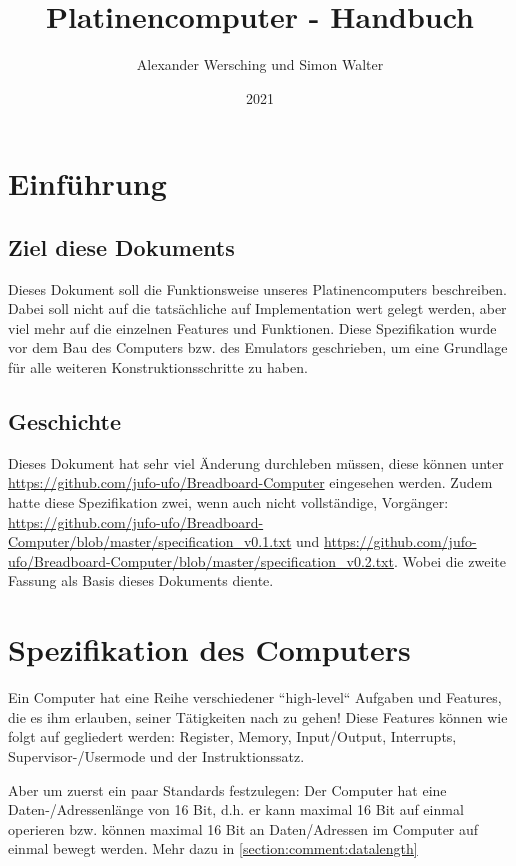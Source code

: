 \documentclass{scrartcl}
\begin{document}
\title{Platinencomputer - Handbuch}
\author{Alexander Wersching und Simon Walter}
\date{2021}
\maketitle
\newpage


\tableofcontents
\newpage

\section{Einführung}
\subsection{Ziel diese Dokuments}
Dieses Dokument soll die Funktionsweise unseres Platinencomputers beschreiben.
Dabei soll nicht auf die tatsächliche auf Implementation wert gelegt werden, aber viel mehr auf die einzelnen Features und Funktionen.
Diese Spezifikation wurde vor dem Bau des Computers bzw. des Emulators geschrieben, um eine Grundlage für alle weiteren Konstruktionsschritte zu haben.

\subsection{Geschichte}
Dieses Dokument hat sehr viel Änderung durchleben müssen, diese können unter \url{https://github.com/jufo-ufo/Breadboard-Computer} eingesehen werden.
Zudem hatte diese Spezifikation zwei, wenn auch nicht vollständige, Vorgänger: \url{https://github.com/jufo-ufo/Breadboard-Computer/blob/master/specification_v0.1.txt} und \url{https://github.com/jufo-ufo/Breadboard-Computer/blob/master/specification_v0.2.txt}. Wobei die zweite Fassung als Basis dieses Dokuments diente.




\section{Spezifikation des Computers}
Ein Computer hat eine Reihe verschiedener ``high-level`` Aufgaben und Features, die es ihm erlauben, seiner Tätigkeiten nach zu gehen! 
Diese Features können wie folgt auf gegliedert werden: Register, Memory, Input/Output, Interrupts, Supervisor-/Usermode und der Instruktionssatz.

Aber um zuerst ein paar Standards festzulegen: Der Computer hat eine Daten-/Adressenlänge von 16 Bit, d.h. er kann maximal 16 Bit auf einmal operieren bzw. können maximal 16 Bit an Daten/Adressen im Computer auf einmal bewegt werden. Mehr dazu in \autoref{section:comment:datalength}
\end{document}
